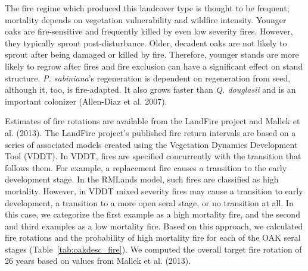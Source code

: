 The fire regime which produced this landcover type is thought to be frequent; mortality depends on vegetation vulnerability and wildfire intensity. Younger oaks are fire-sensitive and frequently killed by even low severity fires. However, they typically sprout post-disturbance. Older, decadent oaks are not likely to sprout after being damaged or killed by fire. Therefore, younger stands are more likely to regrow after fires and fire exclusion can have a significant effect on stand structure. \emph{P. sabiniana}’s regeneration is dependent on regeneration from seed, although it, too, is fire-adapted. It also grows faster than \emph{Q. douglasii} and is an important colonizer (Allen-Diaz et al. 2007). 

Estimates of fire rotations are available from the LandFire project and Mallek et al. (2013). The LandFire project’s published fire return intervals are based on a series of associated models created using the Vegetation Dynamics Development Tool (VDDT). In VDDT, fires are specified concurrently with the transition that follows them. For example, a replacement fire causes a transition to the early development stage. In the RMLands model, such fires are classified as high mortality. However, in VDDT mixed severity fires may cause a transition to early development, a transition to a more open seral stage, or no transition at all. In this case, we categorize the first example as a high mortality fire, and the second and third examples as a low mortality fire. Based on this approach, we calculated fire rotations and the probability of high mortality fire for each of the OAK seral stages (Table~\ref{tab:oakdesc_fire}). We computed the overall target fire rotation of 26 years based on values from Mallek et al. (2013). 




